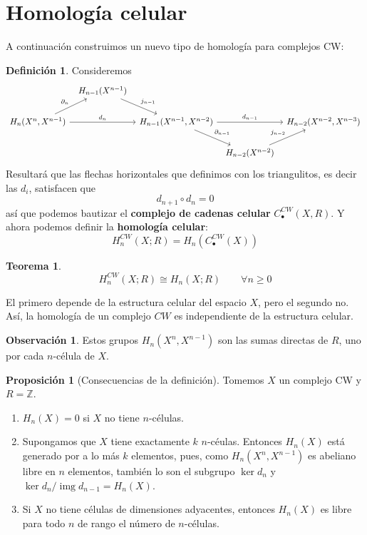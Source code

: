 \documentclass[spanish]{book}
\theoremstyle{definition}
\newtheorem*{defn}{Definición}
\newtheorem*{obs}{Observación}
\newtheorem*{teo}{Teorema}
\newtheorem*{prop}{Proposición}
\newcommand{\Z}{\mathbb{Z}}
\DeclareMathOperator{\img}{img}
\begin{document}
\section{Homología celular}
	A continuación construimos un nuevo tipo de homología para complejos CW:
	\begin{defn} Consideremos
		\[\begin{tikzcd}[column sep=tiny]
			& H_{n-1}(X^{n-1}) \arrow[rd, "j_{n-1}"] \\
			H_n(X^n, X^{n-1}) \arrow[ru, "\partial_n"] \arrow[rr, "d_n"] && H_{n-1}(X^{n-1}, X^{n-2}) \arrow[rd, "\partial_{n-1}"] \arrow[rr, "d_{n-1}"] && H_{n-2}(X^{n-2}, X^{n-3}) \\
			& && H_{n-2}(X^{n-2}) \arrow[ru, "j_{n-2}"]
		\end{tikzcd}\]
		Resultará que las flechas horizontales que definimos con los triangulitos, es decir las $d_i$, satisfacen que \[d_{n+1}\circ d_n=0\] así que podemos bautizar el \textbf{complejo de cadenas celular} $C_\bullet^{CW}(X,R)$. Y ahora podemos definir la \textbf{homología celular}: \[H^{CW}_n(X;R)=H_n(C_\bullet^{CW}(X))\]
	\end{defn}
	\begin{teo}
		\[H_n^{CW}(X;R)\cong H_n(X;R)\qquad\forall n\geq0\]
	\end{teo}
	El primero depende de la estructura celular del espacio $X$, pero el segundo no. Así, la homología de un complejo $CW$ es independiente de la estructura celular.
	\begin{obs}\label{obs1}
		Estos grupos $H_n(X^n,X^{n-1})$ son las sumas directas de $R$, uno por cada $n$-célula de $X$.
	\end{obs}
	\begin{prop}[Consecuencias de la definición] Tomemos $X$ un complejo CW y $R=\Z$.
		\begin{enumerate}
			\item $H_n(X)=0$ si $X$ no tiene $n$-células.
			\item Supongamos que $X$ tiene exactamente $k$ $n$-céulas. Entonces $H_n(X)$ está generado por a lo más $k$ elementos, pues, como $H_n(X^n,X^{n-1})$ es abeliano libre en $n$ elementos, también lo son el subgrupo $\ker d_n$ y $\ker d_n/\img d_{n-1}=H_n(X)$.
			\item Si $X$ no tiene células de dimensiones adyacentes, entonces $H_n(X)$ es libre para todo $n$ de rango el número de $n$-células.
		\end{enumerate}
	\end{prop}
\end{document}
